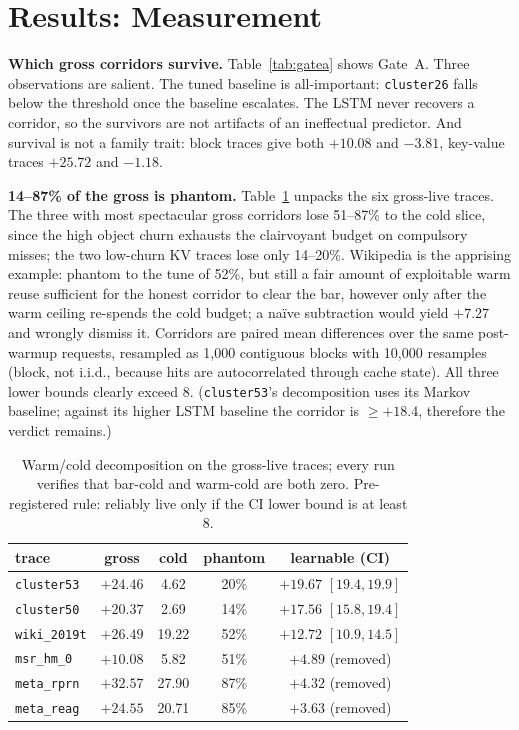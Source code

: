 \documentclass[letterpaper]{article} %
\begin{document}
\section{Results: Measurement}
\textbf{Which gross corridors survive.} Table~\ref{tab:gatea} shows Gate~A. Three observations are salient. The tuned baseline is all-important: \texttt{cluster26} falls below the threshold once the baseline escalates. The LSTM never recovers a corridor, so the survivors are not artifacts of an ineffectual predictor. And survival is not a family trait: block traces give both $+10.08$ and $-3.81$, key-value traces $+25.72$ and $-1.18$.

\textbf{14--87\% of the gross is phantom.} Table~\ref{tab:learnable} unpacks the six gross-live traces. The three with most spectacular gross corridors lose 51--87\% to the cold slice, since the high object churn exhausts the clairvoyant budget on compulsory misses; the two low-churn KV traces lose only 14--20\%. Wikipedia is the apprising example: phantom to the tune of 52\%, but still a fair amount of exploitable warm reuse sufficient for the honest corridor to clear the bar, however only after the warm ceiling re-spends the cold budget; a na\"ive subtraction would yield $+7.27$ and wrongly dismiss it. Corridors are paired mean differences over the same post-warmup requests, resampled as 1{,}000 contiguous blocks with 10{,}000 resamples (block, not i.i.d., because hits are autocorrelated through cache state). All three lower bounds clearly exceed 8. (\texttt{cluster53}'s decomposition uses its Markov baseline; against its higher LSTM baseline the corridor is $\ge +18.4$, therefore the verdict remains.)

\begin{table}[t]
\centering\footnotesize
\setlength{\tabcolsep}{2pt}
\begin{tabular}{lcccc}
\toprule
trace & gross & cold & phantom & \textbf{learnable} (CI) \\
\midrule
\texttt{cluster53} & $+24.46$ & 4.62 & 20\% & $\mathbf{+19.67}$ $[19.4,19.9]$ \\
\texttt{cluster50} & $+20.37$ & 2.69 & 14\% & $\mathbf{+17.56}$ $[15.8,19.4]$ \\
\texttt{wiki\_2019t} & $+26.49$ & 19.22 & 52\% & $\mathbf{+12.72}$ $[10.9,14.5]$ \\
\texttt{msr\_hm\_0} & $+10.08$ & 5.82 & 51\% & $+4.89$ (removed) \\
\texttt{meta\_rprn} & $+32.57$ & 27.90 & 87\% & $+4.32$ (removed) \\
\texttt{meta\_reag} & $+24.55$ & 20.71 & 85\% & $+3.63$ (removed) \\
\bottomrule
\end{tabular}
\caption{Warm/cold decomposition on the gross-live traces; every run verifies that bar-cold and warm-cold are both zero. Pre-registered rule: reliably live only if the CI lower bound is at least 8.}
\label{tab:learnable}
\end{table}
\end{document}

